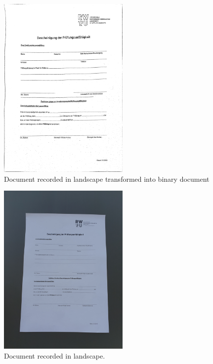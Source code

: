 \documentclass[twocolumn,10pt]{asme2ej}
\begin{document}
\begin{figure}[H]
    \centerline{\includegraphics[width=2.5in]{output/schraeg_1_8_adaptive_binary_image_mean.jpg}}
    \caption{Document recorded in landscape transformed into binary document}
    \label{fig:schraeg2_binary}
\end{figure}

\begin{figure}[H]
    \centerline{\includegraphics[width=2.5in]{output/hoch_1_1_original.jpg}}
    \caption{Document recorded in landscape.}
    \label{fig:hoch1_original}
\end{figure}
\end{document}
